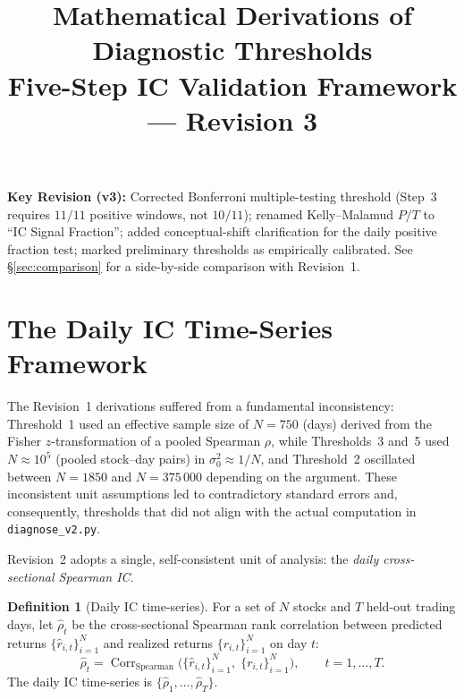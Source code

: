 \documentclass[11pt,a4paper]{article}
\theoremstyle{definition}
\newtheorem{definition}{Definition}[section]
\newcommand{\Corr}{\operatorname{Corr}}
\begin{document}
\title{\textbf{Mathematical Derivations of Diagnostic Thresholds}\\
       \large Five-Step IC Validation Framework --- Revision 3}
\author{}
\date{}
\maketitle

\vspace{-8pt}
\begin{center}
\small\textbf{Key Revision (v3):} Corrected Bonferroni multiple-testing
threshold (Step~3 requires $11/11$ positive windows, not $10/11$);
renamed Kelly--Malamud $P/T$ to ``IC Signal Fraction'';
added conceptual-shift clarification for the daily positive fraction test;
marked preliminary thresholds as empirically calibrated.
See \S\ref{sec:comparison} for a side-by-side comparison with Revision~1.
\end{center}

\section{The Daily IC Time-Series Framework}
\label{sec:framework}

The Revision~1 derivations suffered from a fundamental inconsistency:
Threshold~1 used an effective sample size of $N=750$ (days) derived from
the Fisher $z$-transformation of a pooled Spearman $\rho$, while
Thresholds~3 and~5 used $N \approx 10^{5}$ (pooled stock--day pairs) in
$\sigma_{0}^{2} \approx 1/N$, and Threshold~2 oscillated between $N=1850$
and $N=375\,000$ depending on the argument. These inconsistent unit
assumptions led to contradictory standard errors and, consequently,
thresholds that did not align with the actual computation in
\texttt{diagnose\_v2.py}.

Revision~2 adopts a single, self-consistent unit of analysis: the
\emph{daily cross-sectional Spearman IC}.

\begin{definition}[Daily IC time-series]
\label{def:daily_ic}
For a set of $N$ stocks and $T$ held-out trading days, let
$\hat{\rho}_{t}$ be the cross-sectional Spearman rank correlation
between predicted returns $\{\hat{r}_{i,t}\}_{i=1}^{N}$ and realized
returns $\{r_{i,t}\}_{i=1}^{N}$ on day $t$:
\begin{equation}
    \hat{\rho}_{t} = \Corr_{\text{Spearman}}\!
                    \bigl(\{\hat{r}_{i,t}\}_{i=1}^{N},\;
                          \{r_{i,t}\}_{i=1}^{N}\bigr),
    \qquad t = 1,\dots,T.
    \label{eq:daily_ic}
\end{equation}
The daily IC time-series is $\{\hat{\rho}_{1},\dots,\hat{\rho}_{T}\}$.
\end{definition}
\end{document}
